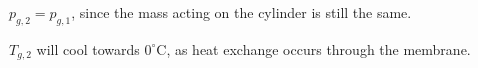 \( p_{g,2} = p_{g,1} \), since the mass acting on the cylinder is still the same.  

\( T_{g,2} \) will cool towards \( 0^\circ \text{C} \), as heat exchange occurs through the membrane.